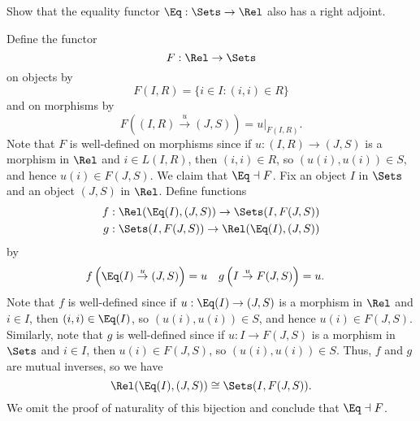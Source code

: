 \begin{exercise}
Show that the equality functor \(\Eq : \Sets \to \Rel\) also has a right adjoint.
\end{exercise}

\begin{solution}
Define the functor
\begin{equation*}
F : \Rel \to \Sets
\end{equation*}
on objects by
\begin{equation*}
F(I, R) = \{i \in I : (i, i) \in R\}
\end{equation*}
and on morphisms by
\begin{equation*}
F\left((I, R) \overset{u}{\to} (J, S)\right)
= u|_{F(I, R)}.
\end{equation*}
Note that \(F\) is well-defined on morphisms since if \(u : (I, R) \to (J, S)\) is a morphism in \(\Rel\) and \(i \in L(I, R)\), then \((i, i) \in R\), so \((u(i), u(i)) \in S\), and hence \(u(i) \in F(J, S)\).
We claim that \(\Eq \dashv F\).
Fix an object \(I\) in \(\Sets\) and an object \((J, S)\) in \(\Rel\).
Define functions
\begin{align*}
f &: \Rel(\Eq(I), (J, S)) \to \Sets(I, F(J, S)) \\
g &: \Sets(I, F(J, S)) \to \Rel(\Eq(I), (J, S))
\end{align*}
by
\begin{align*}
f\left(\Eq(I) \overset{u}{\to} (J, S)\right)
&= u &
g\left(I \overset{u}{\to} F(J, S)\right)
&= u.
\end{align*}
Note that \(f\) is well-defined since if \(u : \Eq(I) \to (J, S)\) is a morphism in \(\Rel\) and \(i \in I\), then \((i, i) \in \Eq(I)\), so \((u(i), u(i)) \in S\), and hence \(u(i) \in F(J, S)\).
Similarly, note that \(g\) is well-defined since if \(u : I \to F(J, S)\) is a morphism in \(\Sets\) and \(i \in I\), then \(u(i) \in F(J, S)\), so \((u(i), u(i)) \in S\).
Thus, \(f\) and \(g\) are mutual inverses, so we have
\begin{equation*}
\Rel(\Eq(I), (J, S)) \cong \Sets(I, F(J, S)).
\end{equation*}
We omit the proof of naturality of this bijection and conclude that \(\Eq \dashv F\).
\end{solution}